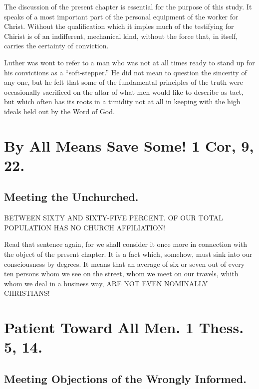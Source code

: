 \documentclass[
]{book}
\begin{document}
The discussion of the present chapter is essential for the purpose of this study. It speaks of a most important part of the personal equipment of the worker for Christ. Without the qualification which it imples much of the testifying for Chirist is of an indifferent, mechanical kind, without the force that, in itself, carries the certainty of conviction.

Luther was wont to refer to a man who was not at all times ready to stand up for his convictions as a ``soft-stepper.'' He did not mean to question the sincerity of any one, but he felt that some of the fundamental principles of the truth were occasionally sacrificed on the altar of what men would like to describe as tact, but which often has its roots in a timidity not at all in keeping with the high ideals held out by the Word of God.

\hypertarget{by-all-means-save-some-1-cor-9-22.}{%
\chapter{By All Means Save Some! 1 Cor, 9, 22.}\label{by-all-means-save-some-1-cor-9-22.}}

\hypertarget{meeting-the-unchurched.}{%
\section*{Meeting the Unchurched.}\label{meeting-the-unchurched.}}

BETWEEN SIXTY AND SIXTY-FIVE PERCENT. OF OUR TOTAL POPULATION HAS NO CHURCH AFFILIATION!

Read that sentence again, for we shall consider it once more in connection with the object of the present chapter. It is a fact which, somehow, must sink into our consciousness by degrees. It means that an average of six or seven out of every ten persons whom we see on the street, whom we meet on our travels, whith whom we deal in a business way, ARE NOT EVEN NOMINALLY CHRISTIANS!

\hypertarget{patient-toward-all-men.-1-thess.-5-14.}{%
\chapter{Patient Toward All Men. 1 Thess. 5, 14.}\label{patient-toward-all-men.-1-thess.-5-14.}}

\hypertarget{meeting-objections-of-the-wrongly-informed.}{%
\section*{Meeting Objections of the Wrongly Informed.}\label{meeting-objections-of-the-wrongly-informed.}}
\end{document}
